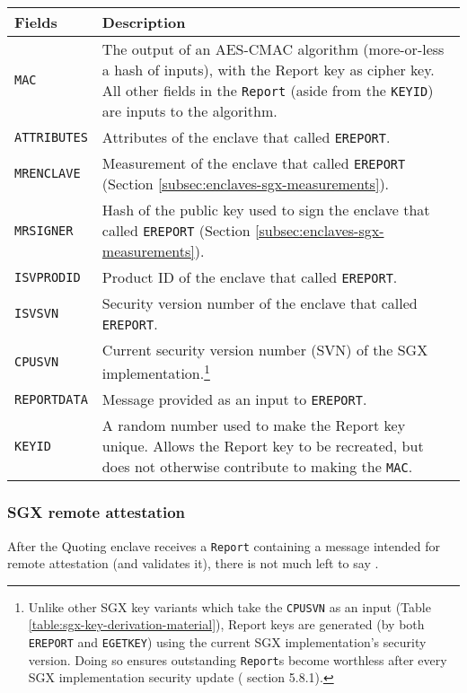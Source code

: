 \begin{tabularx}{\textwidth}{|l|X|}
\caption{{\tt Report} Contents}
\label{table:ereport-contents}\\
\hline
    Fields & Description \\
\hline\hline
    {\tt MAC} & The output of an AES-CMAC algorithm (more-or-less a hash of inputs), with the Report key as cipher key. All other fields in the {\tt Report} (aside from the {\tt KEYID}) are inputs to the algorithm. \\
\hline
    {\tt ATTRIBUTES} & Attributes of the enclave that called {\tt EREPORT}.  \\
\hline
    {\tt MRENCLAVE} & Measurement of the enclave that called {\tt EREPORT} (Section \ref{subsec:enclaves-sgx-measurements}). \\
\hline
    {\tt MRSIGNER} & Hash of the public key used to sign the enclave that called {\tt EREPORT} (Section \ref{subsec:enclaves-sgx-measurements}). \\
\hline
    {\tt ISVPRODID} & Product ID of the enclave that called {\tt EREPORT}. \\
\hline
    {\tt ISVSVN} & Security version number of the enclave that called {\tt EREPORT}. \\
\hline
    {\tt CPUSVN} & Current security version number (SVN) of the SGX implementation.\footnote{Unlike other SGX key variants which take the {\tt CPUSVN} as an input (Table \ref{table:sgx-key-derivation-material}), Report keys are generated (by both {\tt EREPORT} and {\tt EGETKEY}) using the current SGX implementation's security version. Doing so ensures outstanding {\tt Report}s become worthless after every SGX implementation security update (\cite{intel-sgx-explained-advanced} section 5.8.1).} \\
\hline
    {\tt REPORTDATA} & Message provided as an input to {\tt EREPORT}. \\
\hline
    {\tt KEYID} & A random number used to make the Report key unique. Allows the Report key to be recreated, but does not otherwise contribute to making the {\tt MAC}. \\
\hline
\end{tabularx}

\subsubsection{SGX remote attestation}

After the Quoting enclave receives a {\tt Report} containing a message intended for remote attestation (and validates it), there is not much left to say \cite{sgx-attestation-service-api}.

